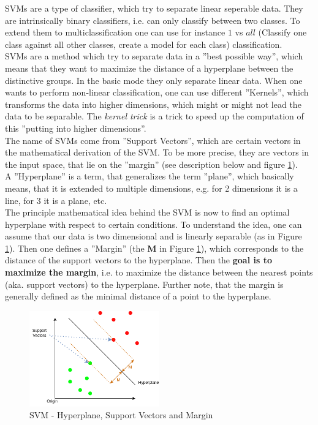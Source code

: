 \documentclass[12pt,a4paper]{article}
\begin{document}
\noindent SVMs are a type of classifier, which try to separate linear seperable data. They are intrinsically binary classifiers, i.e. can only classify between two classes. To extend them to multiclassification one can use for instance \(1\) vs \(all\) (Classify one class against all other classes, create a model for each class) classification.\\
SVMs are a method which try to separate data in a ''best possible way'', which means that they want to maximize the distance of a hyperplane between the distinctive groups. In the basic mode they only separate linear data. When one wants to perform non-linear classification, one can use different ''Kernels'', which transforms the data into higher dimensions, which might or might not lead the data to be separable. The \textit{kernel trick} is a trick to speed up the computation of this ''putting into higher dimensions''.\\[1em]
The name of SVMs come from ''Support Vectors'', which are certain vectors in the mathematical derivation of the SVM. To be more precise, they are vectors in the input space, that lie on the ''margin'' (see description below and figure \ref{fig:svm}).\\
A ''Hyperplane'' is a term, that generalizes the term ''plane'', which basically means, that it is extended to multiple dimensions, e.g. for 2 dimensions it is a line, for 3 it is a plane, etc.\\
The principle mathematical idea behind the SVM is now to find an optimal hyperplane with respect to certain conditions. To understand the idea, one can assume that our data is two dimensional and is linearly separable (as in Figure \ref{fig:svm}). Then one defines a ''Margin'' (the \textbf{M} in Figure \ref{fig:svm}), which corresponds to the distance of the support vectors to the hyperplane. Then the \textbf{goal is to maximize the margin}, i.e. to maximize the distance between the nearest points (aka. support vectors) to the hyperplane. Further note, that the margin is generally defined as the minimal distance of a point to the hyperplane.

\begin{figure}[ht]
    \begin{center}
    \includegraphics[width=0.5\textwidth]{imgs/svm.png}
    \caption{SVM - Hyperplane, Support Vectors and Margin}
    \label{fig:svm}
    \end{center}
\end{figure}
\end{document}
